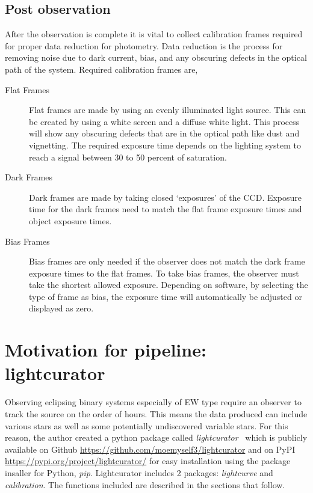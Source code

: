 \subsection{Post observation}
After the observation is complete it is vital to collect calibration frames required for proper data reduction for photometry.
Data reduction is the process for removing noise due to dark current, bias, and any obscuring defects in the optical path of the system.
Required calibration frames are,
\begin{description}
    \item[Flat Frames] Flat frames are made by using an evenly illuminated light source. This can be created by using a white screen
        and a diffuse white light. This process will show any obscuring defects that are in the optical path like dust and vignetting.
        The required exposure time depends on the lighting system to reach a signal between 30 to 50 percent of saturation.
    \item[Dark Frames] Dark frames are made by taking closed `exposures' of the CCD\@. Exposure time for the dark frames need to match
        the flat frame exposure times and object exposure times.
    \item[Bias Frames] Bias frames are only needed if the observer does not match the dark frame exposure times to the flat frames. 
        To take bias frames, the observer must take the shortest allowed exposure. Depending on software, by selecting the type of frame as bias,
        the exposure time will automatically be adjusted or displayed as zero.
\end{description}

\section{Motivation for pipeline: lightcurator}
Observing eclipsing binary systems especially of EW type require an observer to track the source on the order of hours.
This means the data produced can include various stars as well as some potentially undiscovered variable stars.
For this reason, the author created a python package called 
\textit{lightcurator}~\cite{castillo_2019} which is publicly available on Github \url{https://github.com/moemyself3/lightcurator}
and on PyPI \url{https://pypi.org/project/lightcurator/} for easy installation using the package insaller for Python, \textit{pip}.
Lightcurator includes 2 packages: \textit{lightcurve} and \textit{calibration}.
The functions included are described in the sections that follow.

